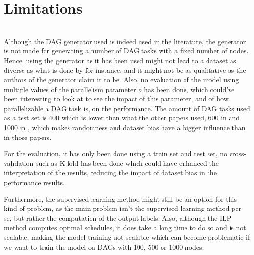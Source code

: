 \section{Limitations}
~
\\


Although the DAG generator used is indeed used in the literature\cite{Lee2021GlobalDagSchedDRL}\cite{zhao2020DAGsched}\cite{Zhao2022DAGsched},
the generator is not made for generating a number of DAG tasks
with a fixed number of nodes. Hence, 
using the generator as it has been used might not
lead to a dataset as diverse as what is done by \citet{Zhao2024GATDRLmodel} for instance,
and it might not be as qualitative as the authors of the generator claim it to be.
Also, no evaluation of the model using multiple values of the parallelism
parameter $p$ has been done, which could've been interesting 
to look at to see the impact of this parameter, and of how parallelizable 
a DAG task is, on the performance.
The amount of DAG tasks used as a test set is 400 which 
is lower than what the other papers used, 600 in \citet{Zhao2024GATDRLmodel}
and 1000 in \citet{Lee2021GlobalDagSchedDRL}, which makes randomness
and dataset bias have a bigger influence than in those papers.

For the evaluation, 
it has only been done using a train set and test set,
no cross-validation such as K-fold has been done which could have
enhanced the interpretation of the results, reducing the impact
of dataset bias in the performance results.

Furthermore, 
the supervised learning method might still be an option
for this kind of problem, as the main problem isn't the supervised
learning method per se, but rather the computation of the output labels. 
Also, although the ILP method computes
optimal schedules, it does take a long time to do so and is not scalable,
making the model training not scalable which can
become problematic if we want to train the model
on DAGs with 100, 500 or 1000 nodes.
